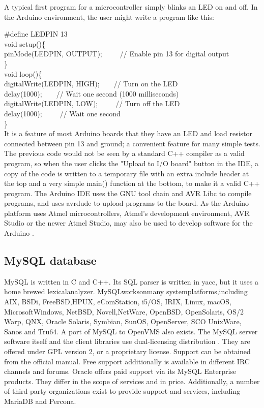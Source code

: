 A typical first program for a microcontroller simply blinks an LED on and off. In the Arduino environment, the user might write a program like this:

\#define LED\textunderscore PIN 13\\
void setup()\{\\
    pinMode(LED\textunderscore PIN, OUTPUT);~~~~~// Enable pin 13 for digital output\\
\}\\
void loop()\{\\
    digitalWrite(LED\textunderscore PIN, HIGH);~~~~// Turn on the LED\\
    delay(1000);~~~~// Wait one second (1000 milliseconds)\\
    digitalWrite(LED\textunderscore PIN, LOW);~~~~~// Turn off the LED\\
    delay(1000);~~~~~// Wait one second\\
\}\\

It is a feature of most Arduino boards that they have an LED and load resistor connected between pin 13 and ground; a convenient feature for many simple tests. The previous code would not be seen by a standard C++ compiler as a valid program, so when the user clicks the "Upload to I/O board" button in the IDE, a copy of the code is written to a temporary file with an extra include header at the top and a very simple main() function at the bottom, to make it a valid C++ program. The Arduino IDE uses the GNU tool chain and AVR Libc to compile programs, and uses avrdude to upload programs to the board. As the Arduino platform uses Atmel microcontrollers, Atmel's development environment, AVR Studio or the newer Atmel Studio, may also be used to develop software for the Arduino \cite{cohen2018automated}.

\subsection{MySQL database}
MySQL is written in C and C++. Its SQL parser is written in yacc, but it uses a home brewed lexicalanalyzer. MySQLworksonmany systemplatforms,including AIX, BSDi, FreeBSD,HPUX, eComStation, i5/OS, IRIX, Linux, macOS, MicrosoftWindows, NetBSD, Novell,NetWare, OpenBSD, OpenSolaris, OS/2 Warp, QNX, Oracle Solaris, Symbian, SunOS, OpenServer, SCO UnixWare, Sanos and Tru64. A port of MySQL to OpenVMS also exists. The MySQL server software itself and the client libraries use dual-licensing distribution \cite{ercan2017rf}. They are offered under GPL version 2, or a proprietary license. Support can be obtained from the official manual. Free support additionally is available in different IRC channels and forums. Oracle offers paid support via its MySQL Enterprise products. They differ in the scope of services and in price. Additionally, a number of third party organizations exist to provide support and services, including MariaDB and Percona.

